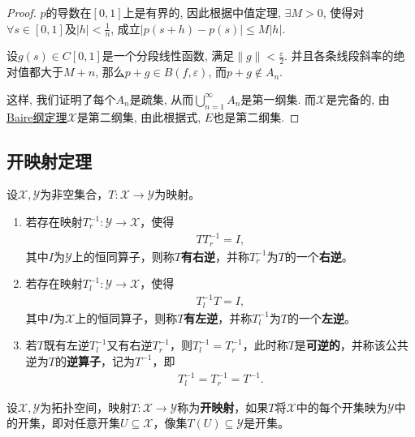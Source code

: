 \documentclass[../../main.tex]{subfiles}%
\begin{document}
\begin{proof}
$p$的导数在$[0,1]$上是有界的, 因此根据中值定理, $\exists M>0$, 使得对$\forall s\in[0,1]$及$|h|<\frac{1}{n}$, 成立$|p(s+h)-p(s)|\leqslant M|h|$.

设$g(s)\in C[0,1]$是一个分段线性函数, 满足$\|g\|<\frac{\varepsilon}{2}$. 并且各条线段斜率的绝对值都大于$M+n$, 那么$p+g\in B(f,\varepsilon)$, 而$p+g\notin A_n$.

这样, 我们证明了每个$A_n$是疏集, 从而$\bigcup\limits_{n=1}^{\infty}A_n$是第一纲集. 而$\mathscr{X}$是完备的, 由\hyperref[theorem:泛函分析--Baire纲定理]{Baire纲定理}$\mathscr{X}$是第二纲集, 由此根据式, $E$也是第二纲集.

\end{proof}


\subsection{开映射定理}

\begin{definition}
设$\mathscr{X},\mathscr{Y}$为非空集合，$T:\mathscr{X}\to\mathscr{Y}$为映射。
\begin{enumerate}[(1)]
\item 若存在映射$T_r^{-1}:\mathscr{Y}\to\mathscr{X}$，使得
\begin{align*}
TT_r^{-1} = I,
\end{align*}
其中$I$为$\mathscr{Y}$上的恒同算子，则称$T$\textbf{有右逆}，并称$T_r^{-1}$为$T$的一个\textbf{右逆}。
\item 若存在映射$T_l^{-1}:\mathscr{Y}\to\mathscr{X}$，使得
\begin{align*}
T_l^{-1}T = I,
\end{align*}
其中$I$为$\mathscr{X}$上的恒同算子，则称$T$\textbf{有左逆}，并称$T_l^{-1}$为$T$的一个\textbf{左逆}。
\item 若$T$既有左逆$T_l^{-1}$又有右逆$T_r^{-1}$，则$T_l^{-1}=T_r^{-1}$，此时称$T$是\textbf{可逆的}，并称该公共逆为$T$的\textbf{逆算子}，记为$T^{-1}$，即
\begin{align*}
T_l^{-1} = T_r^{-1} = T^{-1}.
\end{align*}
\end{enumerate}
\end{definition}

\begin{definition}
设$\mathscr{X},\mathscr{Y}$为拓扑空间，映射$T:\mathscr{X}\to\mathscr{Y}$称为\textbf{开映射}，如果$T$将$\mathscr{X}$中的每个开集映为$\mathscr{Y}$中的开集，即对任意开集$U\subseteq\mathscr{X}$，像集$T(U)\subseteq\mathscr{Y}$是开集。
\end{definition}
\end{document}
